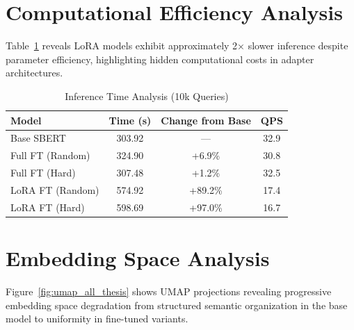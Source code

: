 \section{Computational Efficiency Analysis}

Table~\ref{tab:inference_detailed_thesis} reveals LoRA models exhibit approximately 2× slower inference despite parameter efficiency, highlighting hidden computational costs in adapter architectures.

\begin{table}[h]
\centering
\caption{Inference Time Analysis (10k Queries)}
\label{tab:inference_detailed_thesis}
\begin{tabular}{lccc}
\toprule
Model & Time (s) & Change from Base & QPS \\
\midrule
Base SBERT & 303.92 & — & 32.9 \\
Full FT (Random) & 324.90 & +6.9\% & 30.8 \\
Full FT (Hard) & 307.48 & +1.2\% & 32.5 \\
LoRA FT (Random) & 574.92 & +89.2\% & 17.4 \\
LoRA FT (Hard) & 598.69 & +97.0\% & 16.7 \\
\bottomrule
\end{tabular}
\end{table}

\section{Embedding Space Analysis}

Figure~\ref{fig:umap_all_thesis} shows UMAP projections revealing progressive embedding space degradation from structured semantic organization in the base model to uniformity in fine-tuned variants.

